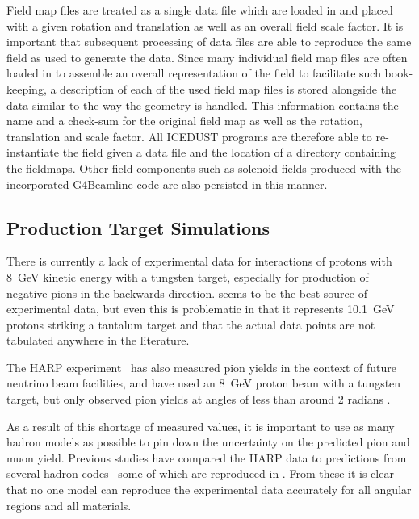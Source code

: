 Field map files are treated as a single data file which are loaded in and placed with a given rotation and translation as well as an overall field scale factor.
It is important that subsequent processing of data files are able to reproduce the same field as used to generate the data.
Since many individual field map files are often loaded in to assemble an overall representation of the field to facilitate such book-keeping, a description of each of the used field map files is stored alongside the data similar to the way the geometry is handled.
This information contains the name and a check-sum for the original field map as well as the rotation, translation and scale factor.
All ICEDUST programs are therefore able to re-instantiate the field given a data file and the location of a directory containing the fieldmaps.
Other field components such as solenoid fields produced with the incorporated G4Beamline code are also persisted in this manner.

\subsection{Production Target Simulations}
\FigPiYieldHadronCodes
There is currently a lack of experimental data for interactions of protons with 8~GeV kinetic energy with a tungsten target, especially for production of negative pions in the backwards direction.
 seems to be the best source of experimental data, but even this is problematic in that it represents 10.1~GeV protons striking a tantalum target and that the actual data points are not tabulated anywhere in the literature.

The HARP experiment~\cite{HARP2007} has also measured pion yields in the context of future neutrino beam facilities, and have used an 8~GeV proton beam with a tungsten target, but only observed pion yields at angles of less than around 2 radians .

As a result of this shortage of measured values, it is important to use as many hadron models as possible to pin down the uncertainty on the predicted pion and muon yield.
Previous studies have compared the HARP data to predictions from several hadron codes~\cite{AEdmondsThesis,YeYangPrivate} some of which are reproduced in .
From these it is clear that no one model can reproduce the experimental data accurately for all angular regions and all materials.

